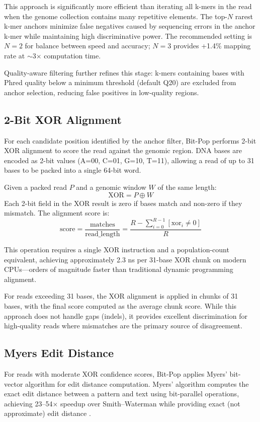 \documentclass{article}
\begin{document}
This approach is significantly more efficient than iterating all k-mers in the read when the genome collection contains many repetitive elements. The top-$N$ rarest k-mer anchors minimize false negatives caused by sequencing errors in the anchor k-mer while maintaining high discriminative power. The recommended setting is $N=2$ for balance between speed and accuracy; $N=3$ provides +1.4\% mapping rate at $\sim$3$\times$ computation time.

Quality-aware filtering further refines this stage: k-mers containing bases with Phred quality below a minimum threshold (default Q20) \citep{ewing1998} are excluded from anchor selection, reducing false positives in low-quality regions.

\subsection{2-Bit XOR Alignment}

For each candidate position identified by the anchor filter, Bit-Pop performs 2-bit XOR alignment to score the read against the genomic region. DNA bases are encoded as 2-bit values (A=00, C=01, G=10, T=11), allowing a read of up to 31 bases to be packed into a single 64-bit word.

Given a packed read $P$ and a genomic window $W$ of the same length:
\[
\text{XOR} = P \oplus W
\]
Each 2-bit field in the XOR result is zero if bases match and non-zero if they mismatch. The alignment score is:
\[
\text{score} = \frac{\text{matches}}{\text{read\_length}} = \frac{R - \sum_{i=0}^{R-1} [\text{xor}_i \neq 0]}{R}
\]

This operation requires a single XOR instruction and a population-count equivalent, achieving approximately 2.3 ns per 31-base XOR chunk on modern CPUs---orders of magnitude faster than traditional dynamic programming alignment.

For reads exceeding 31 bases, the XOR alignment is applied in chunks of 31 bases, with the final score computed as the average chunk score. While this approach does not handle gaps (indels), it provides excellent discrimination for high-quality reads where mismatches are the primary source of disagreement.

\subsection{Myers Edit Distance}

For reads with moderate XOR confidence scores, Bit-Pop applies Myers' bit-vector algorithm for edit distance computation. Myers' algorithm computes the exact edit distance between a pattern and text using bit-parallel operations, achieving 23--54$\times$ speedup over Smith--Waterman while providing exact (not approximate) edit distance \citep{myers1999}.
\end{document}
